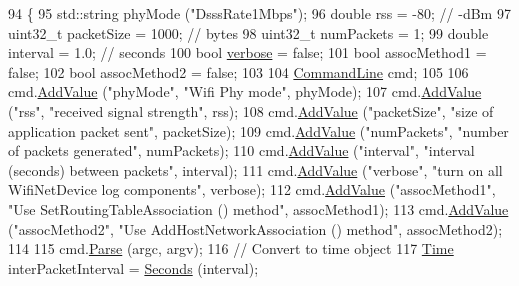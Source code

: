 \begin{DoxyCode}
94 \{
95   std::string phyMode (\textcolor{stringliteral}{"DsssRate1Mbps"});
96   \textcolor{keywordtype}{double} rss = -80;  \textcolor{comment}{// -dBm}
97   uint32\_t packetSize = 1000; \textcolor{comment}{// bytes}
98   uint32\_t numPackets = 1;
99   \textcolor{keywordtype}{double} interval = 1.0; \textcolor{comment}{// seconds}
100   \textcolor{keywordtype}{bool} \hyperlink{openflow-switch_8cc_ab3f078684998b83967d507d0f453f454}{verbose} = \textcolor{keyword}{false};
101   \textcolor{keywordtype}{bool} assocMethod1 = \textcolor{keyword}{false};
102   \textcolor{keywordtype}{bool} assocMethod2 = \textcolor{keyword}{false};
103 
104   \hyperlink{classns3_1_1CommandLine}{CommandLine} cmd;
105 
106   cmd.\hyperlink{classns3_1_1CommandLine_addcfb546c7ad4c8bd0965654d55beb8e}{AddValue} (\textcolor{stringliteral}{"phyMode"}, \textcolor{stringliteral}{"Wifi Phy mode"}, phyMode);
107   cmd.\hyperlink{classns3_1_1CommandLine_addcfb546c7ad4c8bd0965654d55beb8e}{AddValue} (\textcolor{stringliteral}{"rss"}, \textcolor{stringliteral}{"received signal strength"}, rss);
108   cmd.\hyperlink{classns3_1_1CommandLine_addcfb546c7ad4c8bd0965654d55beb8e}{AddValue} (\textcolor{stringliteral}{"packetSize"}, \textcolor{stringliteral}{"size of application packet sent"}, packetSize);
109   cmd.\hyperlink{classns3_1_1CommandLine_addcfb546c7ad4c8bd0965654d55beb8e}{AddValue} (\textcolor{stringliteral}{"numPackets"}, \textcolor{stringliteral}{"number of packets generated"}, numPackets);
110   cmd.\hyperlink{classns3_1_1CommandLine_addcfb546c7ad4c8bd0965654d55beb8e}{AddValue} (\textcolor{stringliteral}{"interval"}, \textcolor{stringliteral}{"interval (seconds) between packets"}, interval);
111   cmd.\hyperlink{classns3_1_1CommandLine_addcfb546c7ad4c8bd0965654d55beb8e}{AddValue} (\textcolor{stringliteral}{"verbose"}, \textcolor{stringliteral}{"turn on all WifiNetDevice log components"}, verbose);
112   cmd.\hyperlink{classns3_1_1CommandLine_addcfb546c7ad4c8bd0965654d55beb8e}{AddValue} (\textcolor{stringliteral}{"assocMethod1"}, \textcolor{stringliteral}{"Use SetRoutingTableAssociation () method"}, assocMethod1);
113   cmd.\hyperlink{classns3_1_1CommandLine_addcfb546c7ad4c8bd0965654d55beb8e}{AddValue} (\textcolor{stringliteral}{"assocMethod2"}, \textcolor{stringliteral}{"Use AddHostNetworkAssociation () method"}, assocMethod2);
114 
115   cmd.\hyperlink{classns3_1_1CommandLine_a5c10b85b3207e5ecb48d907966923156}{Parse} (argc, argv);
116   \textcolor{comment}{// Convert to time object}
117   \hyperlink{classns3_1_1Time}{Time} interPacketInterval = \hyperlink{group__timecivil_ga33c34b816f8ff6628e33d5c8e9713b9e}{Seconds} (interval);

\end{DoxyCode}

